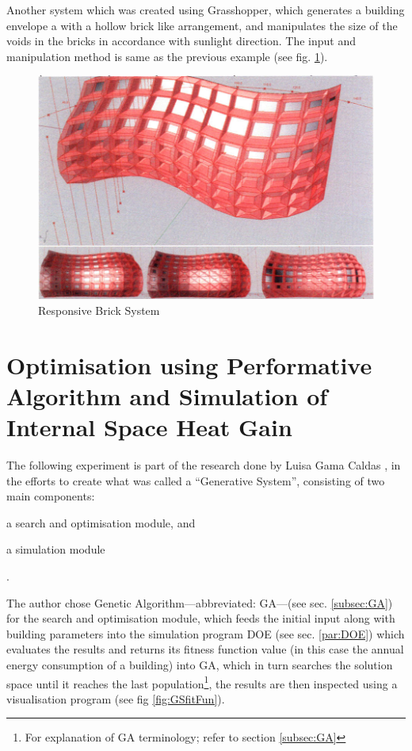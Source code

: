Another system which was created using Grasshopper, which generates a building envelope a with a hollow brick like arrangement, and manipulates the size of the voids in the bricks in accordance with sunlight direction. The input and manipulation method is same as the previous example (see fig. \ref{fig:RBS}).

\begin{figure}[htbp]
\centering
\includegraphics[width=\textwidth]{./Images/35-RBS}
\caption[Responsive Brick System]{Responsive Brick System \cite{yi09}}
\label{fig:RBS}
\end{figure}
 
\clearpage
\section{Optimisation using Performative Algorithm and Simulation of Internal Space Heat Gain}
\label{sec:GSM}

The following experiment is part of the research done by Luisa Gama Caldas \cite{caldas01}, in the efforts to create what was called a ``Generative System'', consisting of two main components: \begin{inparaenum} \item a search and optimisation module, and \item a simulation module \end{inparaenum}.

The author chose Genetic Algorithm---abbreviated: GA---(see sec. \ref{subsec:GA}) for the search and optimisation module, which feeds the initial input along with building parameters into the simulation program DOE (see sec. \ref{par:DOE}) which evaluates the results and returns its fitness function value (in this case the annual energy consumption of a building) into GA, which in turn searches the solution space until it reaches the last population\footnote{For explanation of GA terminology; refer to section \ref{subsec:GA}}, the results are then inspected using a visualisation program (see fig \ref{fig:GSfitFun}).

